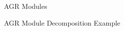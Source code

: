 \begin{figure}[H]
    \centering
    \caption[AGR Modules]{AGR Modules}
    \label{fig_agr_modules}
\end{figure}

\begin{figure}[H]
    \centering
    \caption[AGR Module Decomposition Example]{AGR Module Decomposition Example}
    \label{fig_agr_md}
\end{figure}

